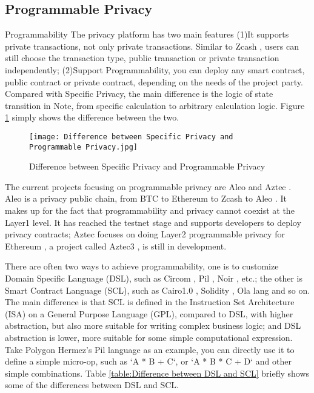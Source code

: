 \subsection{Programmable Privacy}

Programmability The privacy platform has two main features (1)It supports private 
transactions, not only private transactions. Similar to Zcash \cite{website:Zcash}, users can still 
choose the transaction type, public transaction or private transaction independently; 
(2)Support Programmability, you can deploy any smart contract, public contract or 
private contract, depending on the needs of the project party. Compared with Specific 
Privacy, the main difference is the logic of state transition in Note, from specific 
calculation to arbitrary calculation logic. Figure \ref{fig:Difference between Specific Privacy and Programmable Privacy} simply shows the difference 
between the two.
\begin{figure}[!ht]
    \centering
    \texttt{[image: Difference between Specific Privacy and Programmable Privacy.jpg]}
    \caption{Difference between Specific Privacy and Programmable Privacy}
    \label{fig:Difference between Specific Privacy and Programmable Privacy}
\end{figure}

The current projects focusing on programmable privacy are Aleo \cite{website:Aleo} and Aztec \cite{website:Aztec}. Aleo \cite{website:Aleo} is a 
privacy public chain, from BTC \cite{website:BTC} to Ethereum \cite{website:Ethereum} to Zcash \cite{website:Zcash} to Aleo \cite{website:Aleo}. It makes up for 
the fact that programmability and privacy cannot coexist at the Layer1 level. 
It has reached the testnet stage and supports developers to deploy privacy contracts; 
Aztec \cite{website:Aztec} focuses on doing Layer2 programmable privacy for Ethereum \cite{website:Ethereum} , a project 
called Aztec3 \cite{website:Aztec3}, is still in development.

There are often two ways to achieve programmability, one is to customize Domain Specific Language (DSL), such as Circom \cite{website:Circom} , Pil \cite{website:Pil}, Noir \cite{website:Noir}, etc.; the other is Smart Contract Language (SCL), 
such as Cairo1.0 \cite{website:Cairo1.0}, Solidity \cite{website:Solidity}, Ola lang \cite{website:Ola-lang} and so on. The main difference is that SCL is defined in the Instruction Set Architecture (ISA) on a General Purpose Language (GPL), compared to DSL, 
with higher abstraction, but also more suitable for writing complex business logic; and DSL abstraction is lower, more suitable for some simple computational expression. 
Take Polygon Hermez's \cite{website:Polygon-Hermez} Pil \cite{website:Pil} language as an example, you can directly use it to define a simple micro-op, such as `A * B + C`, or `A * B * C + D` and other simple combinations. 
Table \ref{table:Difference between DSL and SCL} briefly shows some of the differences between DSL and SCL.


